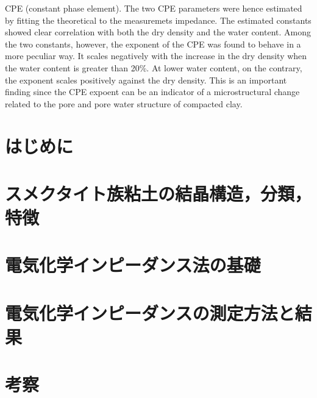 \documentclass[11pt,a4j]{mybook2}
\begin{document}
\begin{center}
\begin{minipage}{15cm}
CPE (constant phase element). The two CPE parameters were hence estimated by fitting the theoretical 
to the measuremets impedance. The estimated constants showed clear correlation with both the dry density 
and the water content. Among the two constants, however, the exponent of the CPE was found to behave 
in a more peculiar way. It scales negatively with the increase in the dry density when the water content 
is greater than 20\%. At lower water content, on the contrary, the exponent scales positively against the dry density. 
This is an important finding since the CPE expoent can be an indicator of a microstructural change 
related to the pore and pore water structure of compacted clay.
\end{minipage}
\end{center}
\tableofcontents
\frontmatter
\mainmatter
\chapter{はじめに}
	
\chapter{スメクタイト族粘土の結晶構造，分類，特徴}
	
\chapter{電気化学インピーダンス法の基礎}
	
\chapter{電気化学インピーダンスの測定方法と結果}
	
\chapter{考察}
	
\end{document}
